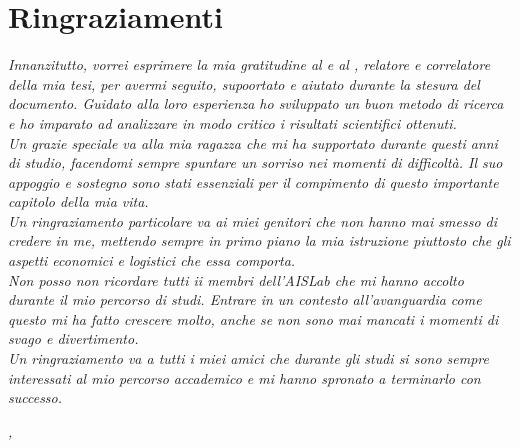 
\cleardoublepage
{}
{}

\bigskip

\begingroup
\let\clearpage\relax
\let\cleardoublepage\relax
\let\cleardoublepage\relax

\chapter*{Ringraziamenti}

\noindent \textit{Innanzitutto, vorrei esprimere la mia gratitudine al \profTitle  \myProf e al \correlatoreTitle \myCorrelatore , relatore e correlatore della mia tesi, per avermi seguito, supoortato e aiutato durante la stesura del documento. Guidato alla loro esperienza ho sviluppato un buon metodo di ricerca e ho imparato ad analizzare in modo critico i risultati scientifici ottenuti.}\\

\noindent \textit{Un grazie speciale va alla mia ragazza che mi ha supportato durante questi anni di studio, facendomi sempre spuntare un sorriso nei momenti di difficoltà. Il suo appoggio e sostegno sono stati essenziali per il compimento di questo importante capitolo della mia vita. }\\

\noindent \textit{Un ringraziamento particolare va ai miei genitori che non hanno mai smesso di credere in me, mettendo sempre in primo piano la mia istruzione piuttosto che gli aspetti economici e logistici che essa comporta.}\\

\noindent \textit{Non posso non ricordare tutti ii membri dell'AISLab che mi hanno accolto durante il mio percorso di studi. Entrare in un contesto all'avanguardia come questo mi ha fatto crescere molto, anche se non sono mai mancati i momenti di svago e divertimento.}\\

\noindent \textit{Un ringraziamento va a tutti i miei amici che durante gli studi si sono sempre interessati al mio percorso accademico e mi hanno spronato a terminarlo con successo.}\\

\bigskip

\noindent\textit{\myLocation, \myTime}
\hfill \myName

\endgroup

